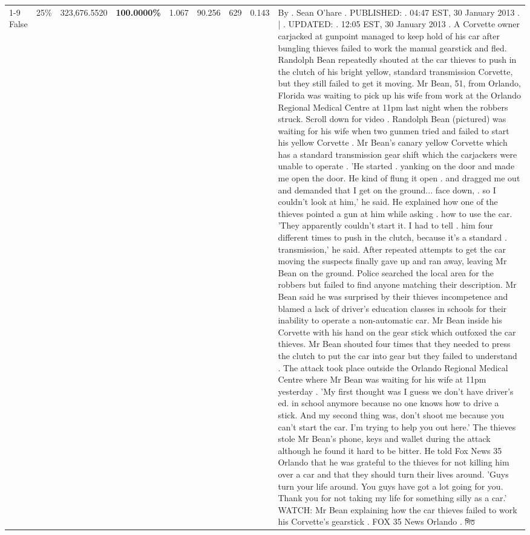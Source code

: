 \begin{table}[H]
\begin{tabular}{lllrlllll}
\cline{1-9} \cline{2-9}
False & 25\% & 323,676.5520 & \bfseries \color{red} 100.0000\% & 1.067 & 90.256 & 629 & 0.143 & By . Sean O'hare . PUBLISHED: . 04:47 EST, 30 January 2013 . | . UPDATED: . 12:05 EST, 30 January 2013 . A Corvette owner carjacked at gunpoint managed to keep hold of his car after bungling thieves failed to work the manual gearstick and fled. Randolph Bean repeatedly shouted at the car thieves to push in the clutch of his bright yellow, standard transmission Corvette, but they still failed to get it moving. Mr Bean, 51, from Orlando, Florida was waiting to pick up his wife from work at the Orlando Regional Medical Centre at 11pm last night when the robbers struck. Scroll down for video . Randolph Bean (pictured) was waiting for his wife when two gunmen tried and failed to start his yellow Corvette . Mr Bean's canary yellow Corvette which has a standard transmission gear shift which the carjackers were unable to operate . 'He started . yanking on the door and made me open the door. He kind of flung it open . and dragged me out and demanded that I get on the ground... face down, . so I couldn't look at him,' he said. He explained how one of the thieves pointed a gun at him while asking . how to use the car. 'They apparently couldn't start it. I had to tell . him four different times to push in the clutch, because it's a standard . transmission,' he said. After repeated attempts to get the car moving the suspects finally gave up and ran away, leaving Mr Bean on the ground. Police searched the local area for the robbers but failed to find anyone matching their description. Mr Bean said he was surprised by their thieves incompetence and blamed a lack of driver's education classes in schools for their inability to operate a non-automatic car. Mr Bean inside his Corvette with his hand on the gear stick which outfoxed the car thieves. Mr Bean shouted four times that they needed to press the clutch to put the car into gear but they failed to understand . The attack took place outside the Orlando Regional Medical Centre where Mr Bean was waiting for his wife at 11pm yesterday . 'My first thought was I guess we don't have driver's ed. in school anymore because no one knows how to drive a stick. And my second thing was, don't shoot me because you can't start the car. I'm trying to help you out here.' The thieves stole Mr Bean's phone, keys and wallet during the attack although he found it hard to be bitter. He told Fox News 35 Orlando that he was grateful to the thieves for not killing him over a car and that they should turn their lives around. 'Guys turn your life around. You guys have got a lot going for you. Thank you for not taking my life for something silly as a car.' WATCH: Mr Bean explaining how the car thieves failed to work his Corvette's gearstick . FOX 35 News Orlando . দিত \\

\end{tabular}
\end{table}

